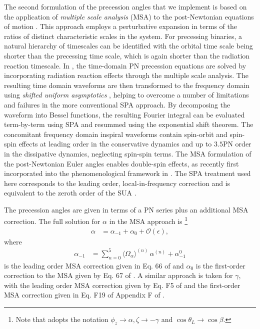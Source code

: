 \documentclass[%
aps,
prd,
amssymb,
amsmath,
amsfonts,
eqsecnum,
showpacs,
nofootinbib,
floatfix,
twocolumn,
twoside,
a4paper,
superscriptaddress
]{revtex4-1}
\begin{document}
The second formulation of the precession angles that we implement is based on the application of \textit{multiple scale analysis} (MSA) \cite{Bender:1999aa} to the post-Newtonian equations of motion \cite{Racine:2008qv,Klein:2013qda,Kesden:2014sla,Gerosa:2015hba,Chatziioannou:2013dza,Chatziioannou:2017tdw}. This approach employs a perturbative expansion in terms of the ratios of distinct characteristic scales in the system. For precessing binaries, a natural hierarchy of timescales can be identified with the orbital time scale being shorter than the precessing time scale, which is again shorter than the radiation reaction timescale. In \cite{Chatziioannou:2017tdw}, the time-domain PN precession equations are solved by incorporating radiation reaction effects through the multiple scale analysis. The resulting time domain waveforms are then transformed to the frequency domain using \textit{shifted uniform asymptotics} \cite{Klein:2014bua}, helping to overcome a number of limitations and failures in the more conventional SPA approach. By decomposing the waveform into Bessel functions, the resulting Fourier integral can be evaluated term-by-term using SPA and resummed using the exponential shift theorem. The concomitant frequency domain inspiral waveforms contain spin-orbit and spin-spin effects at leading order in the conservative dynamics and up to $3.5$PN order in the dissipative dynamics, neglecting spin-spin terms. The MSA formulation of the post-Newtonian Euler angles enables double-spin effects, as recently first incorporated into the phenomenological framework in \cite{Khan:2018fmp,Khan:2019kot}. The SPA treatment used here corresponds to the leading order, local-in-frequency correction and is equivalent to the zeroth order of the SUA \cite{Klein:2014bua,Marsat:2018oam}. 

The precession angles are given in terms of a PN series plus an additional MSA correction. The full solution for $\alpha$ in the MSA approach is \cite{Chatziioannou:2017tdw}\footnote{Note that \cite{Chatziioannou:2017tdw} adopts the notation $\phi_z \rightarrow \alpha, \zeta \rightarrow -\gamma$ and $\cos \theta_L \rightarrow \cos \beta$.}
\begin{align}
    \alpha &= \alpha_{-1} + \alpha_0 + \mathcal{O}(\epsilon) ,
\end{align}
where
\begin{align}
    \alpha_{-1} &= \displaystyle\sum^5_{n = 0} \langle \Omega_{\alpha} \rangle^{(n)} \, \alpha^{(n)} + \alpha^{0}_{-1}
\end{align}
is the leading order MSA correction given in Eq. 66 of \cite{Chatziioannou:2017tdw}
and $\alpha_{0}$ is the first-order correction to the MSA given by Eq. 67 of \cite{Chatziioannou:2017tdw}. A similar approach is taken for $\gamma$, with the leading order MSA correction given by Eq. F5 of \cite{Chatziioannou:2017tdw} and the first-order MSA correction given in Eq. F19 of Appendix F of \cite{Chatziioannou:2017tdw}.
\end{document}
